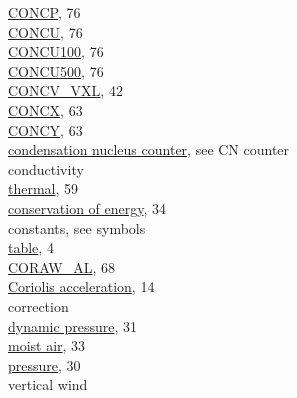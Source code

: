 \documentclass[
]{article}
\begin{document}
\href{./7-aerosol-particle-measurements.html\#concu-concp}{CONCP}, 76\\
\href{./7-aerosol-particle-measurements.html\#concu-concp}{CONCU}, 76\\
\href{./5-cloud-physics-variables.html\#concentration}{CONCU100}, 76\\
\href{./5-cloud-physics-variables.html\#concentration}{CONCU500}, 76\\
\href{./4-the-state-of-the-atmosphere.html\#vcsel-corr}{CONCV\_VXL},
42\\
\href{./5-cloud-physics-variables.html\#concentration}{CONCX}, 63\\
\href{./5-cloud-physics-variables.html\#concentration}{CONCY}, 63\\
\href{./7-aerosol-particle-measurements.html\#condensation-nucleus-counter}{condensation
nucleus counter}, see CN counter\\
conductivity\\
\hspace*{0.333em}\hspace*{0.333em}\href{./5-cloud-physics-variables.html\#plwcc}{thermal},
59\\
\href{./4-the-state-of-the-atmosphere.html\#ATX}{conservation of
energy}, 34\\
constants, see symbols\\
\hspace*{0.333em}\hspace*{0.333em}\href{./1-introduction.html\#constants-and-symbols}{table},
4\\
\href{./6-air-chemistry-measurements.html\#coraw-al}{CORAW\_AL}, 68\\
\href{./3-the-state-of-the-aircraft.html\#wp3}{Coriolis acceleration},
14\\
correction\\
\hspace*{0.333em}\hspace*{0.333em}\href{./4-the-state-of-the-atmosphere.html\#qcx}{dynamic
pressure}, 31\\
\hspace*{0.333em}\hspace*{0.333em}\href{./4-the-state-of-the-atmosphere.html\#ambient-t}{moist
air}, 33\\
\hspace*{0.333em}\hspace*{0.333em}\href{./4-the-state-of-the-atmosphere.html\#psx}{pressure},
30\\
\hspace*{0.333em}\hspace*{0.333em}vertical wind\\
\end{document}

